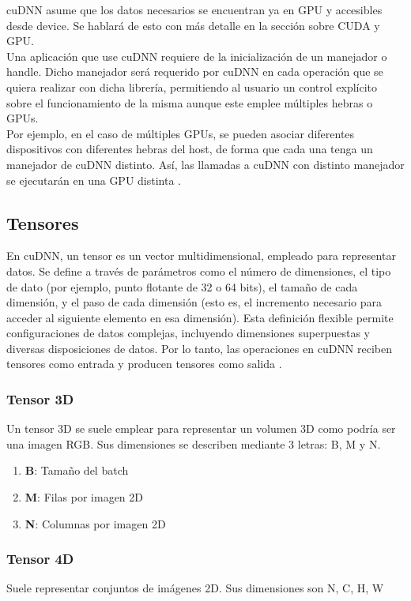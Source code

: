 cuDNN asume que los datos necesarios se encuentran ya en GPU y accesibles desde device. Se hablará de esto con más detalle en la sección sobre CUDA y GPU. \\
Una aplicación que use cuDNN requiere de la inicialización de un manejador o handle. Dicho manejador será requerido por cuDNN en cada operación que se quiera realizar con dicha librería, permitiendo al usuario un control explícito sobre el funcionamiento de la misma aunque este emplee múltiples hebras o GPUs. \\
Por ejemplo, en el caso de múltiples GPUs, se pueden asociar diferentes dispositivos con diferentes hebras del host, de forma que cada una tenga un manejador de cuDNN distinto. Así, las llamadas a cuDNN con distinto manejador se ejecutarán en una GPU distinta \cite{cuDNN_core_concepts}.

\subsection{Tensores}

En cuDNN, un tensor es un vector multidimensional, empleado para representar datos. Se define a través de parámetros como el número de dimensiones, el tipo de dato (por ejemplo, punto flotante de 32 o 64 bits), el tamaño de cada dimensión, y el paso de cada dimensión (esto es, el incremento necesario para acceder al siguiente elemento en esa dimensión). Esta definición flexible permite configuraciones de datos complejas, incluyendo dimensiones superpuestas y diversas disposiciones de datos. Por lo tanto, las operaciones en cuDNN reciben tensores como entrada y producen tensores como salida \cite{cuDNN_core_concepts}.

\subsubsection{Tensor 3D}
Un tensor 3D se suele emplear para representar un volumen 3D como podría ser una imagen RGB. Sus dimensiones se describen mediante 3 letras: B, M y N.

\begin{enumerate}
	\item \textbf{B}: Tamaño del batch
	\item \textbf{M}: Filas por imagen 2D
	\item \textbf{N}: Columnas por imagen 2D
\end{enumerate}

\subsubsection{Tensor 4D \label{NCHW}}
Suele representar conjuntos de imágenes 2D. Sus dimensiones son N, C, H, W

